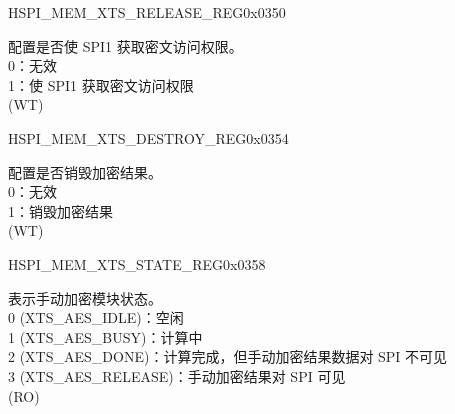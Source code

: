 \begin{register}{H}{SPI\_MEM\_XTS\_RELEASE\_REG}{0x0350}\label{regdesc:SPIMEMXTSRELEASEREG}
%
%
\regnewline%
\begin{regdesc}\begin{reglist}
\label{fielddesc:SPIMEMXTSRELEASE}\item [SPI\_MEM\_XTS\_RELEASE] 配置是否使 SPI1 获取密文访问权限。\\
0：无效\\
1：使 SPI1 获取密文访问权限\\
(WT)
\end{reglist}\end{regdesc}
\end{register}

\begin{register}{H}{SPI\_MEM\_XTS\_DESTROY\_REG}{0x0354}\label{regdesc:SPIMEMXTSDESTROYREG}
%
%
\regnewline%
\begin{regdesc}\begin{reglist}
\label{fielddesc:SPIMEMXTSDESTROY}\item [SPI\_MEM\_XTS\_DESTROY] 配置是否销毁加密结果。\\
0：无效\\
1：销毁加密结果\\
(WT)
\end{reglist}\end{regdesc}
\end{register}


\begin{register}{H}{SPI\_MEM\_XTS\_STATE\_REG}{0x0358}\label{regdesc:SPIMEMXTSSTATEREG}
%
%
\regnewline%
\begin{regdesc}\begin{reglist}
\label{fielddesc:SPIMEMXTSSTATE}\item [SPI\_MEM\_XTS\_STATE] 表示手动加密模块状态。\\
0 (XTS\_AES\_IDLE)：空闲\\
1 (XTS\_AES\_BUSY)：计算中\\
2 (XTS\_AES\_DONE)：计算完成，但手动加密结果数据对 SPI 不可见\\
3 (XTS\_AES\_RELEASE)：手动加密结果对 SPI 可见\\
(RO)
\end{reglist}\end{regdesc}
\end{register}


